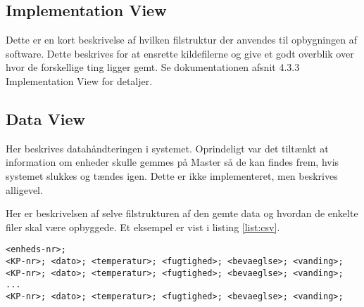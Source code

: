 
\subsection{Implementation View}
Dette er en kort beskrivelse af hvilken filstruktur der anvendes til opbygningen af software. Dette beskrives for at ensrette kildefilerne og give et godt overblik over hvor de forskellige ting ligger gemt.
Se dokumentationen afsnit 4.3.3 Implementation View for detaljer.

\subsection{Data View}
Her beskrives datahåndteringen i systemet. Oprindeligt var det tiltænkt at information om enheder skulle gemmes på Master så de kan findes frem, hvis systemet slukkes og tændes igen. Dette er ikke implementeret, men beskrives alligevel.

Her er beskrivelsen af selve filstrukturen af den gemte data og hvordan de enkelte filer skal være opbyggede. 
Et eksempel er vist i listing \ref{list:csv}.

\begin{lstlisting}[caption=Semikolon-separeret datafil til log af enheder, label={list:csv}]
<enheds-nr>;
<KP-nr>; <dato>; <temperatur>; <fugtighed>; <bevaeglse>; <vanding>;
<KP-nr>; <dato>; <temperatur>; <fugtighed>; <bevaeglse>; <vanding>;
...
<KP-nr>; <dato>; <temperatur>; <fugtighed>; <bevaeglse>; <vanding>;
\end{lstlisting}



